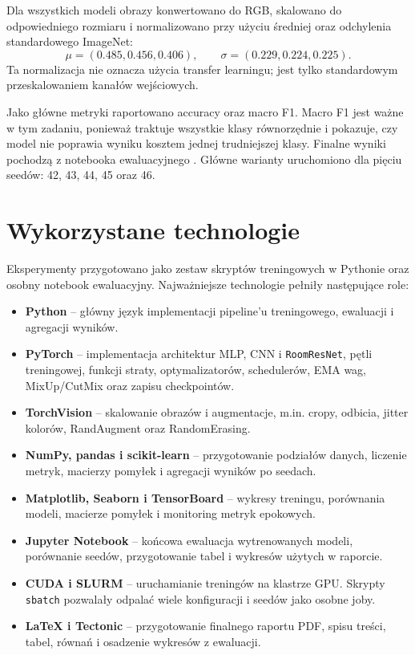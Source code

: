 \documentclass[12pt,a4paper]{article}
\begin{document}
Dla wszystkich modeli obrazy konwertowano do RGB, skalowano do odpowiedniego rozmiaru i normalizowano przy użyciu średniej oraz odchylenia standardowego ImageNet:
\[
\mu=(0.485, 0.456, 0.406), \qquad \sigma=(0.229, 0.224, 0.225).
\]
Ta normalizacja nie oznacza użycia transfer learningu; jest tylko standardowym przeskalowaniem kanałów wejściowych.

Jako główne metryki raportowano accuracy oraz macro F1. Macro F1 jest ważne w tym zadaniu, ponieważ traktuje wszystkie klasy równorzędnie i pokazuje, czy model nie poprawia wyniku kosztem jednej trudniejszej klasy. Finalne wyniki pochodzą z notebooka ewaluacyjnego . Główne warianty uruchomiono dla pięciu seedów: 42, 43, 44, 45 oraz 46.

\section{Wykorzystane technologie}

Eksperymenty przygotowano jako zestaw skryptów treningowych w Pythonie oraz osobny notebook ewaluacyjny. Najważniejsze technologie pełniły następujące role:

\begin{itemize}
  \item \textbf{Python} -- główny język implementacji pipeline'u treningowego, ewaluacji i agregacji wyników.
  \item \textbf{PyTorch} -- implementacja architektur MLP, CNN i \texttt{RoomResNet}, pętli treningowej, funkcji straty, optymalizatorów, schedulerów, EMA wag, MixUp/CutMix oraz zapisu checkpointów.
  \item \textbf{TorchVision} -- skalowanie obrazów i augmentacje, m.in. cropy, odbicia, jitter kolorów, RandAugment oraz RandomErasing.
  \item \textbf{NumPy, pandas i scikit-learn} -- przygotowanie podziałów danych, liczenie metryk, macierzy pomyłek i agregacji wyników po seedach.
  \item \textbf{Matplotlib, Seaborn i TensorBoard} -- wykresy treningu, porównania modeli, macierze pomyłek i monitoring metryk epokowych.
  \item \textbf{Jupyter Notebook} -- końcowa ewaluacja wytrenowanych modeli, porównanie seedów, przygotowanie tabel i wykresów użytych w raporcie.
  \item \textbf{CUDA i SLURM} -- uruchamianie treningów na klastrze GPU. Skrypty \texttt{sbatch} pozwalały odpalać wiele konfiguracji i seedów jako osobne joby.
  \item \textbf{LaTeX i Tectonic} -- przygotowanie finalnego raportu PDF, spisu treści, tabel, równań i osadzenie wykresów z ewaluacji.
\end{itemize}
\end{document}
